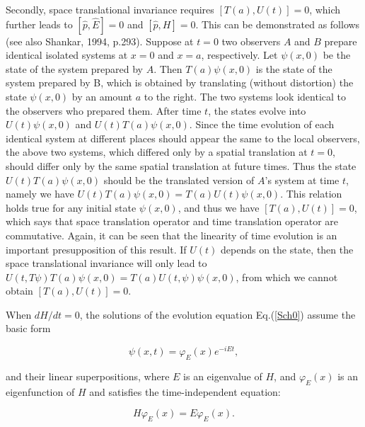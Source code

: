 Secondly, space translational invariance requires $[T(a),U(t)]=0$, which further leads to $[\hat{p},\hat{E}]=0$ and $[\hat{p},H]=0$. This can be demonstrated as follows (see also Shankar, 1994, p.293). Suppose at $t = 0$ two observers $A$ and $B$ prepare identical isolated systems at $x = 0$ and $x = a$, respectively. Let $\psi(x,0)$ be the state of the system prepared by $A$. Then $T(a)\psi(x,0)$ is the state of the system prepared by B, which is obtained by translating (without distortion) the state  $\psi(x,0)$ by an amount $a$ to the right. The two systems look identical to the observers who prepared them. After time $t$, the states evolve into  $U(t)\psi(x,0)$ and  $U(t)T(a)\psi(x,0)$. Since the time evolution of each identical system at different places should appear the same to the local observers, the above two systems, which differed only by a spatial translation at $t = 0$, should differ only by the same spatial translation at future times. Thus the state $U(t)T(a)\psi(x,0)$  should be the translated version of $A$'s system at time $t$, namely we have $U(t)T(a)\psi(x,0)=T(a)U(t)\psi(x,0)$. This relation holds true for any initial state $\psi(x,0)$, and thus we have $[T(a),U(t)]=0$, which says that space translation operator and time translation operator are commutative. Again, it can be seen that the linearity of time evolution is an important presupposition of this result. If $U(t)$ depends on the state, then the space translational invariance will only lead to $U(t, T\psi)T(a)\psi(x,0)=T(a)U(t,\psi)\psi(x,0)$, from which we cannot obtain $[T(a),U(t)]=0$. 

When $dH/dt=0$, the solutions of the evolution equation Eq.(\ref{Sch0}) assume the basic form

\begin{equation}
\psi(x,t)=\varphi_E(x)e^{-iEt},
\label{Sch1}
\end{equation}

\noindent and their linear superpositions, where $E$ is an eigenvalue of $H$, and $\varphi_E(x)$ is an eigenfunction of $H$ and satisfies the time-independent equation: 

\begin{equation}
H\varphi_E(x)=E\varphi_E(x). 
\label{}
\end{equation}


